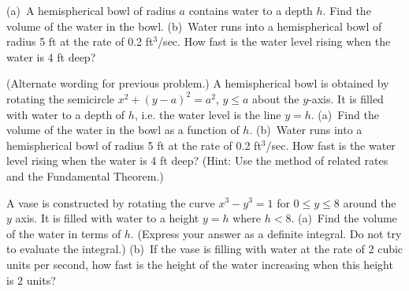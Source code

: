 \begin{multicols}{2}
  \problem (a)~A hemispherical bowl of radius $a$ contains water to a depth
  $h$. Find the volume of the water in the bowl.  (b)~Water runs into a
  hemispherical bowl of radius 5 ft at the rate of 0.2 ft${}^3$/sec. How fast
  is the water level rising when the water is 4 ft deep?


  \problem (Alternate wording for previous problem.)  A hemispherical bowl is
  obtained by rotating the semicircle $x^2+(y-a)^2=a^2$, $y\le a$ about the
  $y$-axis.  It is filled with water to a depth of $h$, i.e. the water level
  is the line $y=h$. (a)~Find the volume of the water in the bowl as a
  function of $h$. (b)~Water runs into a hemispherical bowl of radius 5 ft at
  the rate of 0.2 ft${}^3$/sec. How fast is the water level rising when the
  water is 4 ft deep?  (Hint: Use the method of related rates and the
  Fundamental Theorem.)


  \problem A vase is constructed by rotating the curve $x^3-y^3=1$ for $0\le
  y\le 8$ around the $y$ axis.  It is filled with water to a height $y=h$
  where $h<8$.  (a)~Find the volume of the water in terms of $h$.  (Express
  your answer as a definite integral.  Do not try to evaluate the integral.)
  (b)~If the vase is filling with water at the rate of 2 cubic units per
  second, how fast is the height of the water increasing when this height is
  $2$ units?

\end{multicols}
\noproblemfont

